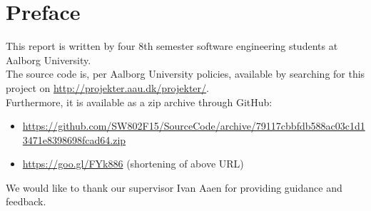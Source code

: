 \chapter{Preface}
This report is written by four 8th semester software engineering students at Aalborg University.\\

\noindent The source code is, per Aalborg University policies, available by searching for this project on \url{http://projekter.aau.dk/projekter/}.\\

\noindent Furthermore, it is available as a zip archive through GitHub:

\begin{itemize}
\item \parbox{.8\textwidth}{\url{https://github.com/SW802F15/SourceCode/archive/79117cbbfdb588ac03c1d13471e8398698fcad64.zip}}
\item \url{https://goo.gl/FYk886} (shortening of above URL)
\end{itemize}

We would like to thank our supervisor Ivan Aaen for providing guidance and feedback.














\vspace{5cm}
\noindent 